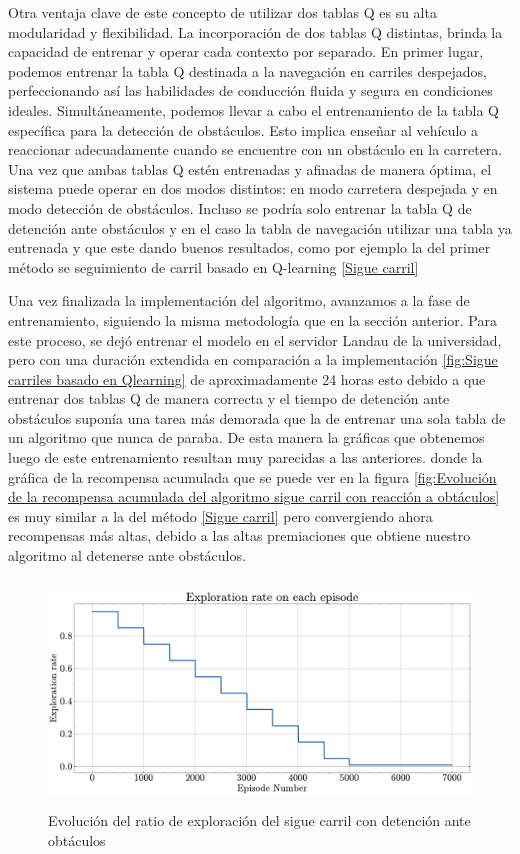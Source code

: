 \bigskip

Otra ventaja clave de este concepto de utilizar dos tablas Q es su alta modularidad y flexibilidad. La incorporación de dos tablas Q distintas, brinda la capacidad de entrenar y operar cada contexto por separado. En primer lugar, podemos entrenar la tabla Q destinada a la navegación en carriles despejados, perfeccionando así las habilidades de conducción fluida y segura en condiciones ideales. Simultáneamente, podemos llevar a cabo el entrenamiento de la tabla Q específica para la detección de obstáculos. Esto implica enseñar al vehículo a reaccionar adecuadamente cuando se encuentre con un obstáculo en la carretera. Una vez que ambas tablas Q estén entrenadas y afinadas de manera óptima, el sistema puede operar en dos modos distintos: en modo carretera despejada y en modo detección de obstáculos. Incluso se podría solo entrenar la tabla Q de detención ante obstáculos y en el caso la tabla de navegación utilizar una tabla ya entrenada y que este dando buenos resultados, como por ejemplo la del primer método se seguimiento de carril basado en Q-learning \ref{Sigue carril} 

\bigskip

Una vez finalizada la implementación del algoritmo, avanzamos a la fase de entrenamiento, siguiendo la misma metodología que en la sección anterior. Para este proceso, se dejó entrenar el modelo en el servidor Landau de la universidad, pero con una duración extendida en comparación a la implementación \ref{fig:Sigue carriles basado en Qlearning} de aproximadamente 24 horas esto debido a que entrenar dos tablas Q de manera correcta y el tiempo de detención ante obstáculos suponía una tarea más demorada que la de entrenar una sola tabla de un algoritmo que nunca de paraba. De esta manera la gráficas que obtenemos luego de este entrenamiento resultan muy parecidas a las anteriores. donde la gráfica de la recompensa acumulada que se puede ver en la figura \ref{fig:Evolución de la recompensa acumulada del algoritmo sigue carril con reacción a obtáculos} es muy similar a la del método \ref{Sigue carril}  pero convergiendo ahora recompensas más altas, debido a las altas premiaciones que obtiene nuestro algoritmo al detenerse ante obstáculos.


  \begin{figure}[h]
    \centering
    \includegraphics[height=6cm]{imagenes/cap4/sigue_carriles_qlearning/exploration_rate.pdf}
    \caption{Evolución del ratio de exploración del sigue carril con detención ante obtáculos}
    \label{fig:Evolución del ratio de exploración del algoritmo sigue carril con reacción a obtáculos}
\end{figure}

